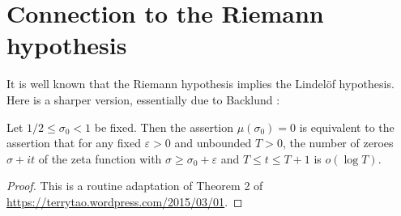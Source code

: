 \literature
{}

\section{Connection to the Riemann hypothesis}

It is well known that the Riemann hypothesis implies the Lindel\"of hypothesis.  Here is a sharper version, essentially due to Backlund \cite{backlund}:

\begin{lemma}  Let $1/2 \leq \sigma_0 < 1$ be fixed.  Then the assertion $\mu(\sigma_0)=0$ is equivalent to the assertion that for any fixed $\varepsilon>0$ and unbounded $T>0$, the number of zeroes $\sigma+it$ of the zeta function with $\sigma \geq \sigma_0+\varepsilon$ and $T \leq t \leq T+1$ is $o(\log T)$.
\end{lemma}

\begin{proof} This is a routine adaptation of Theorem 2 of \url{https://terrytao.wordpress.com/2015/03/01}.
\end{proof}
